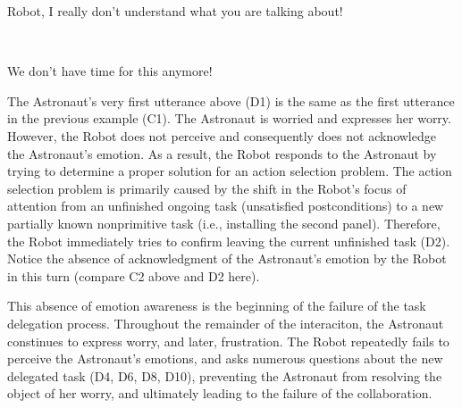 \begin{description}
  \item \textit{\textbf{\fontsize{9pt}{12pt}\selectfont{D9. Astronaut:}}} Robot,
  I really don't understand what you are talking about!\\
  
  \item {}\\

  \item \textit{\textbf{\fontsize{9pt}{12pt}\selectfont{D11. Astronaut:}}} We
  don't have time for this anymore!
  
\end{description}

The Astronaut's very first utterance above (D1) is the same as the first
utterance in the previous example (C1). The Astronaut is worried and expresses
her worry. However, the Robot does not perceive and consequently does not
acknowledge the Astronaut's emotion. As a result, the Robot responds to the
Astronaut by trying to determine a proper solution for an action selection
problem. The action selection problem is primarily caused by the shift in the
Robot's focus of attention from an unfinished ongoing task (unsatisfied
postconditions) to a new partially known nonprimitive task (i.e., installing the
second panel). Therefore, the Robot immediately tries to confirm leaving the
current unfinished task (D2). Notice the absence of acknowledgment of the
Astronaut's emotion by the Robot in this turn (compare C2 above and D2 here).

This absence of emotion awareness is the beginning of the failure of the task
delegation process. Throughout the remainder of the interaciton, the Astronaut
constinues to express worry, and later, frustration. The Robot repeatedly fails
to perceive the Astronaut's emotions, and asks numerous questions about the new
delegated task (D4, D6, D8, D10), preventing the Astronaut from resolving the
object of her worry, and ultimately leading  to the failure of the
collaboration.

